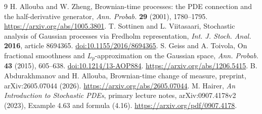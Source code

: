 \documentclass[11pt]{article}
\begin{document}
\begin{thebibliography}{9}
 H. Allouba and W. Zheng,
Brownian-time processes: the PDE connection and the
half-derivative generator, \emph{Ann. Probab.}
\textbf{29} (2001), 1780--1795.
\url{https://arxiv.org/abs/1005.3801}.
 T. Sottinen and L. Viitasaari,
Stochastic analysis of Gaussian processes via Fredholm
representation, \emph{Int. J. Stoch. Anal.}
\textbf{2016}, article 8694365.
\href{https://doi.org/10.1155/2016/8694365}
{doi:10.1155/2016/8694365}.
 S. Geiss and A. Toivola,
On fractional smoothness and $L_p$-approximation on the Gaussian space,
\emph{Ann. Probab.} \textbf{43} (2015), 605--638.
\href{https://doi.org/10.1214/13-AOP884}{doi:10.1214/13-AOP884}.
\url{https://arxiv.org/abs/1206.5415}.
 B. Abdurakhmanov and H. Allouba,
Brownian-time change of measure, preprint,
arXiv:2605.07044 (2026).
\url{https://arxiv.org/abs/2605.07044}.
 M. Hairer, \emph{An Introduction to Stochastic PDEs}, primary lecture notes, arXiv:0907.4178v2 (2023), Example 4.63 and formula (4.16). \url{https://arxiv.org/pdf/0907.4178}.
\end{thebibliography}
\end{document}
